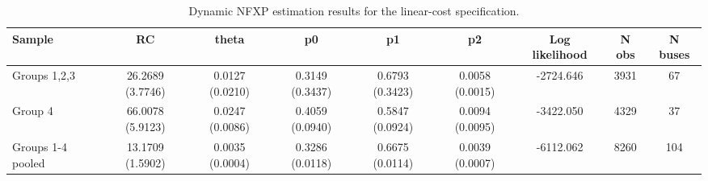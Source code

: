 \begin{table}[htbp]
\centering
\caption{Dynamic NFXP estimation results for the linear-cost specification.}
\label{tab:rust\_simplified\_estimation}
\begin{tabular}{lcccccccc}
\toprule
Sample & RC & theta & p0 & p1 & p2 & Log likelihood & N obs & N buses \\
\midrule
Groups 1,2,3 & 26.2689 (3.7746) & 0.0127 (0.0210) & 0.3149 (0.3437) & 0.6793 (0.3423) & 0.0058 (0.0015) & -2724.646 & 3931 & 67 \\
Group 4 & 66.0078 (5.9123) & 0.0247 (0.0086) & 0.4059 (0.0940) & 0.5847 (0.0924) & 0.0094 (0.0095) & -3422.050 & 4329 & 37 \\
Groups 1-4 pooled & 13.1709 (1.5902) & 0.0035 (0.0004) & 0.3286 (0.0118) & 0.6675 (0.0114) & 0.0039 (0.0007) & -6112.062 & 8260 & 104 \\
\bottomrule
\end{tabular}
\end{table}